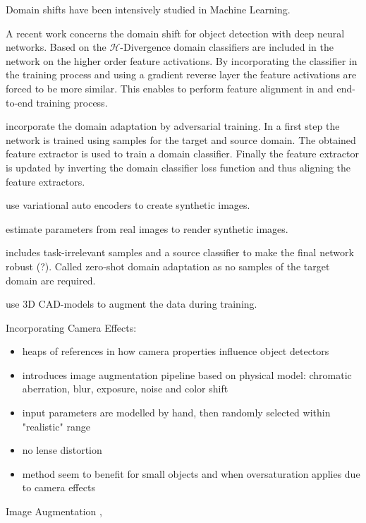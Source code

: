 Domain shifts have been intensively studied in Machine Learning. 

A recent work \cite{Chen2018c} concerns the domain shift for object detection with deep neural networks. Based on the $\mathcal{H}$-Divergence \cite{Ben-David2010} domain classifiers are included in the network on the higher order feature activations. By incorporating the classifier in the training process and using a gradient reverse layer  the feature activations are forced to be more similar. This enables to perform feature alignment in and end-to-end training process.

\cite{Xu2017} incorporate the domain adaptation by adversarial training. In a first step the network is trained using samples for the target and source domain. The obtained feature extractor is used to train a domain classifier. Finally the feature extractor is updated by inverting the domain classifier loss function and thus aligning the feature extractors.

\cite{Inoue} use variational auto encoders to create synthetic images.

\cite{Rozantsev} estimate parameters from real images to render synthetic images.

\cite{Peng2017} includes task-irrelevant samples and a source classifier to make the final network robust (?). Called zero-shot domain adaptation as no samples of the target domain are required.

\cite{Liu2018a}

\cite{Peng} use 3D CAD-models to augment the data during training.

Incorporating Camera Effects:
\cite{Carlson2018}
\begin{itemize}
	\item heaps of references in how camera properties influence object detectors
	\item introduces image augmentation pipeline based on physical model: chromatic aberration, blur, exposure, noise and color shift
	\item input parameters are modelled by hand, then randomly selected within "realistic" range
	\item no lense distortion
	\item method seem to benefit for small objects and when oversaturation applies due to camera effects
\end{itemize}


\cite{Vass}

Image Augmentation
\cite{Bai2017},

